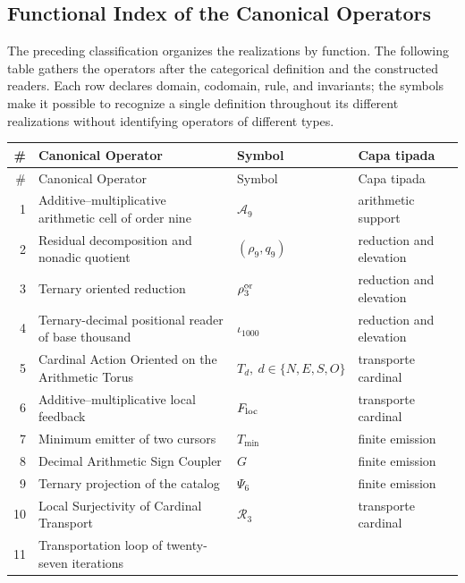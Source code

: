 \subsection{Functional Index of the Canonical Operators}

The preceding classification organizes the realizations by function. The following table
gathers the operators after the categorical definition and the constructed
readers. Each row declares domain, codomain, rule, and invariants; the
symbols make it possible to recognize a single definition throughout its
different realizations without identifying operators of different types.

\begingroup
\footnotesize
\renewcommand{\arraystretch}{1.06}

\begin{longtable}{@{}r >{\raggedright\arraybackslash}p{}
  >{\raggedright\arraybackslash}p{}
  >{\raggedright\arraybackslash}p{}@{}}
\toprule
\# & Canonical Operator & Symbol & Capa tipada \\
\midrule
\endfirsthead
\toprule
\# & Canonical Operator & Symbol & Capa tipada \\
\midrule
\endhead
1 & Additive--multiplicative arithmetic cell of order nine
  & \(\mathcal A_9\) & arithmetic support \\
2 & Residual decomposition and nonadic quotient
  & \((\rho_9,q_9)\) & reduction and elevation \\
3 & Ternary oriented reduction
  & \(\rho_3^{\rm or}\) & reduction and elevation \\
4 & Ternary-decimal positional reader of base thousand
  & \(\iota_{1000}\) & reduction and elevation \\
5 & Cardinal Action Oriented on the Arithmetic Torus
  & \(T_d,\ d\in\{N,E,S,O\}\) & transporte cardinal \\
6 & Additive--multiplicative local feedback
  & \(F_{\rm loc}\) & transporte cardinal \\
7 & Minimum emitter of two cursors
  & \(T_{\min}\) & finite emission \\
8 & Decimal Arithmetic Sign Coupler
  & \(G\) & finite emission \\
9 & Ternary projection of the catalog
  & \(\Psi_6\) & finite emission \\
10 & Local Surjectivity of Cardinal Transport
  & \(\mathcal R_3\) & transporte cardinal \\
11 & Transportation loop of twenty-seven iterations

\end{longtable}
